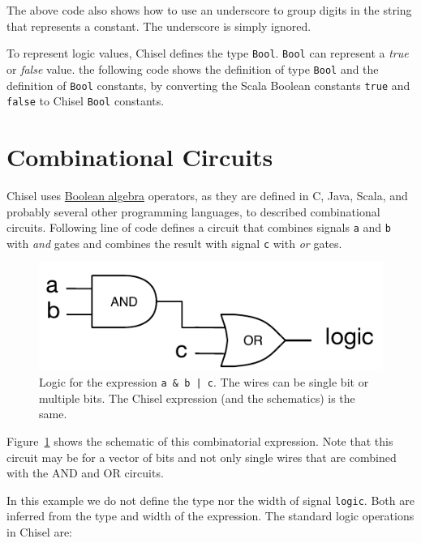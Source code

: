 \documentclass[%
    10pt, %
    headinclude, footexclude,
    openright, %
    notitlepage,
    cleardoubleempty,
    headsepline,
    pointlessnumbers,
    bibtotoc, idxtotoc,
    ]{scrbook}
\newcommand{\code}[1]{{\small{\texttt{#1}}}}
\newcommand{\scale}{0.7}
\newcommand{\myref}[2]{\href{#1}{#2}}
\begin{document}


\noindent The above code also shows how to use an underscore to group digits in the
string that represents a constant. The underscore is simply ignored.

To represent logic values, Chisel defines the type \code{Bool}.
\code{Bool} can represent a \emph{true} or \emph{false} value.
the following code shows the definition of type \code{Bool} and the definition of
\code{Bool} constants, by converting the Scala Boolean constants \code{true}
and \code{false} to Chisel \code{Bool} constants.




\section{Combinational Circuits}

Chisel uses \myref{https://en.wikipedia.org/wiki/Boolean_algebra}{Boolean algebra} operators,
as they are defined in C, Java, Scala, and probably several other programming languages,
to described combinational circuits.
Following line of code defines a circuit that combines signals \code{a} and \code{b} with \emph{and}
gates and combines the result with signal \code{c} with \emph{or} gates.



\begin{figure}
  \centering
  \includegraphics[scale=\scale]{figures/logic}
  \caption{Logic for the expression \code{a \& b | c}.
  The wires can be single bit or multiple bits. The Chisel expression (and the schematics) is the same.}
  \label{fig:logic}
\end{figure}


Figure~\ref{fig:logic} shows the schematic of this combinatorial expression.
Note that this circuit may be for a vector of bits and not only single wires
that are combined with the AND and OR circuits.

In this example we do not define the type nor the width of signal \code{logic}.
Both are inferred from the type and width of the expression.
The standard logic operations in Chisel are:
\end{document}
